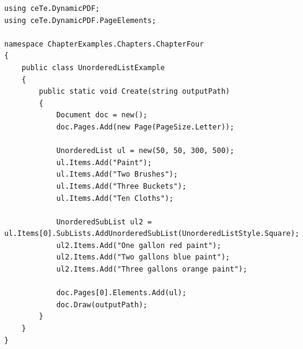\documentclass[american]{tufte-book}
\numberwithin{equation}{section}
\numberwithin{figure}{section}
\begin{document}
\bgroup{}
\begin{lstlisting}[caption={Adding an unordered list to a PDF document.},label={lis:Adding-an-unordered},basicstyle={\footnotesize\ttfamily},breaklines=true]
using ceTe.DynamicPDF;
using ceTe.DynamicPDF.PageElements;

namespace ChapterExamples.Chapters.ChapterFour
{
    public class UnorderedListExample
    {
        public static void Create(string outputPath)
        {
            Document doc = new();
            doc.Pages.Add(new Page(PageSize.Letter));

            UnorderedList ul = new(50, 50, 300, 500);
            ul.Items.Add("Paint");
            ul.Items.Add("Two Brushes");
            ul.Items.Add("Three Buckets");
            ul.Items.Add("Ten Cloths");

            UnorderedSubList ul2 = ul.Items[0].SubLists.AddUnorderedSubList(UnorderedListStyle.Square);
            ul2.Items.Add("One gallon red paint");
            ul2.Items.Add("Two gallons blue paint");
            ul2.Items.Add("Three gallons orange paint");

            doc.Pages[0].Elements.Add(ul);
            doc.Draw(outputPath);
        }
    }
}
\end{lstlisting}
\leavevmode\egroup
\end{document}
